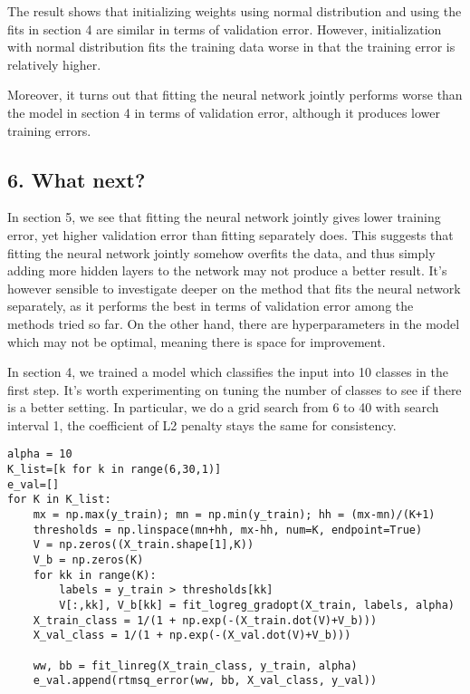 \documentclass[11pt]{article}
\begin{document}
The result shows that initializing weights using normal distribution and
using the fits in section 4 are similar in terms of validation error.
However, initialization with normal distribution fits the training data
worse in that the training error is relatively higher.

Moreover, it turns out that fitting the neural network jointly performs
worse than the model in section 4 in terms of validation error, although
it produces lower training errors.

\hypertarget{what-next}{%
\subsection{6. What next?}\label{what-next}}

In section 5, we see that fitting the neural network jointly gives lower
training error, yet higher validation error than fitting separately
does. This suggests that fitting the neural network jointly somehow
overfits the data, and thus simply adding more hidden layers to the
network may not produce a better result. It's however sensible to
investigate deeper on the method that fits the neural network
separately, as it performs the best in terms of validation error among
the methods tried so far. On the other hand, there are hyperparameters
in the model which may not be optimal, meaning there is space for
improvement.

In section 4, we trained a model which classifies the input into 10
classes in the first step. It's worth experimenting on tuning the number
of classes to see if there is a better setting. In particular, we do a
grid search from 6 to 40 with search interval 1, the coefficient of L2
penalty stays the same for consistency.

\begin{verbatim}
alpha = 10
K_list=[k for k in range(6,30,1)]
e_val=[]
for K in K_list:
    mx = np.max(y_train); mn = np.min(y_train); hh = (mx-mn)/(K+1)
    thresholds = np.linspace(mn+hh, mx-hh, num=K, endpoint=True)
    V = np.zeros((X_train.shape[1],K))
    V_b = np.zeros(K)
    for kk in range(K):
        labels = y_train > thresholds[kk]
        V[:,kk], V_b[kk] = fit_logreg_gradopt(X_train, labels, alpha)
    X_train_class = 1/(1 + np.exp(-(X_train.dot(V)+V_b)))
    X_val_class = 1/(1 + np.exp(-(X_val.dot(V)+V_b)))
    
    ww, bb = fit_linreg(X_train_class, y_train, alpha)
    e_val.append(rtmsq_error(ww, bb, X_val_class, y_val))
\end{verbatim}
\end{document}
